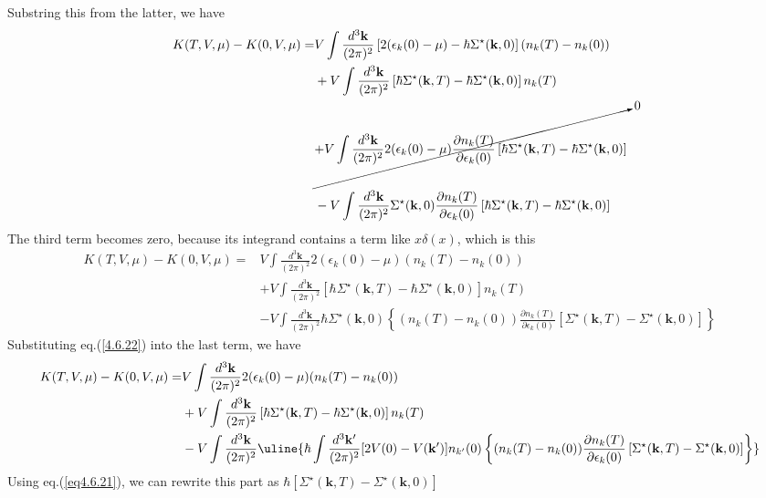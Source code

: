 Substring this from the latter, we have
\[
\begin{aligned}
K(T,V,\mu)-K(0,V,\mu)=&V\int \frac{d^3 \mathbf{k}}{(2\pi)^2} \left[ 2(\epsilon_k(0)-\mu)-\hbar \Sigma^\star (\mathbf{k},0) \right] (n_k(T)-n_k(0))\\
&+V\int \frac{d^3 \mathbf{k}}{(2\pi)^2}  \left[\hbar \Sigma^\star (\mathbf{k},T) - \hbar \Sigma^\star (\mathbf{k},0) \right] n_k(T)\\
& \cancelto{0}{+V\int \frac{d^3 \mathbf{k}}{(2\pi)^2} 2(\epsilon_k(0)-\mu) \frac{\partial n_k(T)}{\partial \epsilon_k(0)}  \left[\hbar \Sigma^\star (\mathbf{k},T) - \hbar \Sigma^\star (\mathbf{k},0) \right] }\\
&\\
&-V\int \frac{d^3 \mathbf{k}}{(2\pi)^2} \Sigma^\star(\mathbf{k},0)  \frac{\partial n_k(T)}{\partial \epsilon_k(0)}  \left[\hbar \Sigma^\star (\mathbf{k},T) - \hbar \Sigma^\star (\mathbf{k},0) \right] 
\end{aligned}
\]
The third term becomes zero, because its integrand contains a term like $x \delta(x)$, which is this
\[
\begin{aligned}
K(T,V,\mu)-K(0,V,\mu)=&V\int \frac{d^3 \mathbf{k}}{(2\pi)^2} 2(\epsilon_k(0)-\mu) (n_k(T)-n_k(0))\\
&+V\int \frac{d^3 \mathbf{k}}{(2\pi)^2}  \left[\hbar \Sigma^\star (\mathbf{k},T) - \hbar \Sigma^\star (\mathbf{k},0) \right] n_k(T)\\
&-V\int \frac{d^3 \mathbf{k}}{(2\pi)^2} \hbar \Sigma^\star(\mathbf{k},0) \left\{ (n_k(T)-n_k(0)) \frac{\partial n_k(T)}{\partial \epsilon_k(0)}  \left[ \Sigma^\star (\mathbf{k},T) -  \Sigma^\star (\mathbf{k},0) \right] \right\}
\end{aligned}
\]
 Substituting eq.(\ref{4.6.22}) into the last term, we have
\[
\begin{aligned}
K(T,V,\mu)-K(0,V,\mu)=&V\int \frac{d^3 \mathbf{k}}{(2\pi)^2} 2(\epsilon_k(0)-\mu) (n_k(T)-n_k(0))\\
&+V\int \frac{d^3 \mathbf{k}}{(2\pi)^2}  \left[\hbar \Sigma^\star (\mathbf{k},T) - \hbar \Sigma^\star (\mathbf{k},0) \right] n_k(T)\\
&-V\int \frac{d^3 \mathbf{k}}{(2\pi)^2}\uline{ \hbar \int \frac{d^3 \mathbf{k}'}{(2\pi)^2} [2V(0)-V(\mathbf{k}')] n_{k'}(0) \left\{ (n_k(T)-n_k(0)) \frac{\partial n_k(T)}{\partial \epsilon_k(0)}  \left[ \Sigma^\star (\mathbf{k},T) -  \Sigma^\star (\mathbf{k},0) \right] \right\} }
\end{aligned}
\]
 Using eq.(\ref{eq4.6.21}), we can rewrite this part as $\hbar \left[ \Sigma^\star (\mathbf{k},T) -  \Sigma^\star (\mathbf{k},0) \right]$
